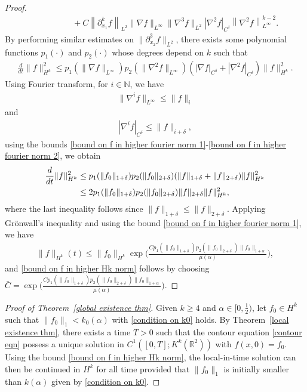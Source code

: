 \documentclass[reqno]{amsart}%
\theoremstyle{definition}
\theoremstyle{remark}
\numberwithin{equation}{section}
\newcommand{\0}{\mathbf{0}}
\newcommand{\1}{\mathbf{1}}
\newcommand{\N}{\mathbb N}
\newcommand{\R}{\mathbb R}
\numberwithin{equation}{section}
\numberwithin{theorem}{section}
\numberwithin{figure}{section}
\begin{document}
\begin{proof}
\begin{align*}
&\qquad\qquad+C\left\|\partial_{x_1}^k f\right\|_{L^2}\|\nabla f\|_{L^\infty}\|\nabla^3 f\|_{L^2}\left|\nabla^2 f\right|_{C^{\delta}} \left\|\nabla^2 f\right\|^{k-2}_{L^{\infty}}.
\end{align*}
By performing similar estimates on $\|\partial_{x_2}^3 f\|_{L^2}$, there exists some polynomial functions $p_1(\cdot)$ and $p_2(\cdot)$ whose degrees depend on $k$ such that
\begin{align*}
\frac{d}{dt}\|f\|^2_{H^k}\le p_1(\|\nabla f\|_{L^\infty})p_2(\|\nabla^2 f\|_{L^\infty})(|\nabla f|_{C^\delta}+|\nabla^2 f|_{C^\delta})\|f\|_{H^k}^2.
\end{align*}
Using Fourier transform, for $i\in\N$, we have
\begin{align*}
\|\nabla^{i} f\|_{L^\infty}\le \|f\|_{i}
\end{align*}
and
\begin{align*}
|\nabla^{i} f|_{C^\delta}\le \|f\|_{i+\delta},
\end{align*}
using the bounds \eqref{bound on f in higher fourier norm 1}-\eqref{bound on f in higher fourier norm 2}, we obtain
\begin{align*}
\frac{d}{dt}\|f\|^2_{H^k}&\le p_1(\|f_0\|_{1+\delta})p_2(\|f_0\|_{2+\delta})(\|f\|_{1+\delta}+\|f\|_{2+\delta})\|f\|_{H^k}^2\notag\\
&\le 2p_1(\|f_0\|_{1+\delta})p_2(\|f_0\|_{2+\delta})\|f\|_{2+\delta}\|f\|_{H^k}^2,
\end{align*}
where the last inequality follows since $\|f\|_{1+\delta}\le\|f\|_{2+\delta}$. Applying Gr\"{o}nwall's inequality and using the bound \eqref{bound on f in higher fourier norm 1}, we have
\begin{align*}
\|f\|_{H^k}(t)\le\|f_0\|_{H^k}\exp\Big(\frac{Cp_1(\|f_0\|_{1+\delta})p_2(\|f_0\|_{2+\delta})\|f_0\|_{1+\alpha}}{\mu(\alpha)}\Big),
\end{align*}
and \eqref{bound on f in higher Hk norm} follows by choosing $\bar{C}=\exp\Big(\frac{Cp_1(\|f_0\|_{1+\delta})p_2(\|f_0\|_{2+\delta})\|f_0\|_{1+\alpha}}{\mu(\alpha)}\Big)$.
\end{proof}
\begin{proof}[Proof of Theorem~\ref{global existence thm}]
Given $k\ge4$ and $\alpha\in[0,\frac{1}{2})$, let $f_0\in H^k$ such that $\|f_0\|_{1}<k_0(\alpha)$ with \eqref{condition on k0} holds. By Theorem~\ref{local existence thm}, there exists a time $T>0$ such that the contour equation \eqref{contour eqn} possess a unique solution in $C^1([0,T];K^k(\R^2))$ with $f(x,0)=f_0$. Using the bound \eqref{bound on f in higher Hk norm}, the local-in-time solution can then be continued in $H^k$ for all time provided that $\|f_0\|_{1}$ is initially smaller than $k(\alpha)$ given by \eqref{condition on k0}.
\end{proof}
\end{document}
